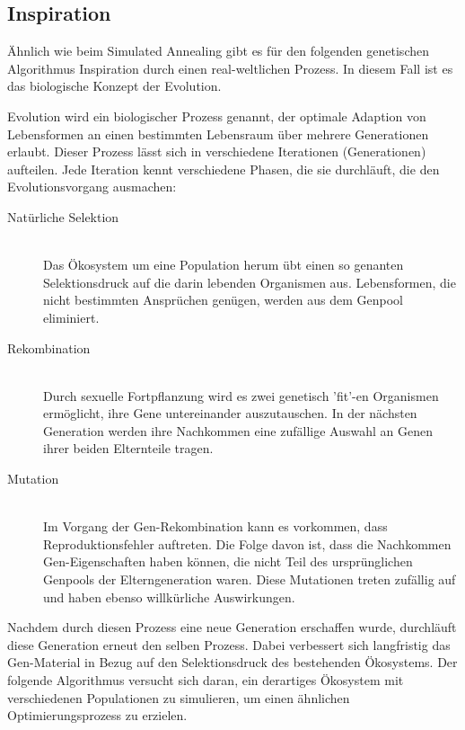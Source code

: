 \documentclass[runningheads,a4paper]{llncs}
\begin{document}
\subsection{Inspiration}

\cite{weicker2007evolutionare} Ähnlich wie beim Simulated Annealing gibt es für den folgenden genetischen Algorithmus Inspiration durch einen real-weltlichen Prozess. In diesem Fall ist es das biologische Konzept der Evolution.

Evolution wird ein biologischer Prozess genannt, der optimale Adaption von Lebensformen an einen bestimmten Lebensraum über mehrere Generationen erlaubt. Dieser Prozess lässt sich in verschiedene Iterationen (Generationen) aufteilen. Jede Iteration kennt verschiedene Phasen, die sie durchläuft, die den Evolutionsvorgang ausmachen:

\begin{description}
	\item[Natürliche Selektion] \hfill \\ Das Ökosystem um eine Population herum übt einen so genanten Selektionsdruck auf die darin lebenden Organismen aus. Lebensformen, die nicht bestimmten Ansprüchen genügen, werden aus dem Genpool eliminiert.

	\item[Rekombination] \hfill \\ Durch sexuelle Fortpflanzung wird es zwei genetisch 'fit'-en Organismen ermöglicht, ihre Gene untereinander auszutauschen. In der nächsten Generation werden ihre Nachkommen eine zufällige Auswahl an Genen ihrer beiden Elternteile tragen.

	\item[Mutation] \hfill \\ Im Vorgang der Gen-Rekombination kann es vorkommen, dass Reproduktionsfehler auftreten. Die Folge davon ist, dass die Nachkommen Gen-Eigenschaften haben können, die nicht Teil des ursprünglichen Genpools der Elterngeneration waren. Diese Mutationen treten zufällig auf und haben ebenso willkürliche Auswirkungen.
\end{description}

Nachdem durch diesen Prozess eine neue Generation erschaffen wurde, durchläuft diese Generation erneut den selben Prozess. Dabei verbessert sich langfristig das Gen-Material in Bezug auf den Selektionsdruck des bestehenden Ökosystems. Der folgende Algorithmus versucht sich daran,  ein derartiges Ökosystem mit verschiedenen Populationen zu simulieren, um einen ähnlichen Optimierungsprozess zu erzielen.
\end{document}

